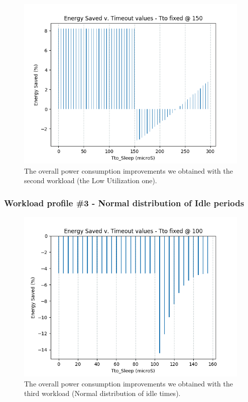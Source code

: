 \documentclass[a4paper]{article}
\begin{document}
        \begin{figure}[htp]
            \centering
            \includegraphics[width=0.5 \columnwidth]{./screenshots/Sleep_case2.png}
            \caption{
                    \label{fig:Sleep_case2}
                    The overall power consumption improvements we obtained with the second workload (the Low Utilization one).
            }
        \end{figure}

        \subsubsection{Workload profile \#3 - Normal distribution of Idle periods}
        \begin{figure}[htp]
            \centering
            \includegraphics[width=0.5 \columnwidth]{./screenshots/Sleep_case3.png}
            \caption{
                    \label{fig:Sleep_case3}
                    The overall power consumption improvements we obtained with the third workload (Normal distribution of idle times).
            }
        \end{figure}

        \newpage
\end{document}
